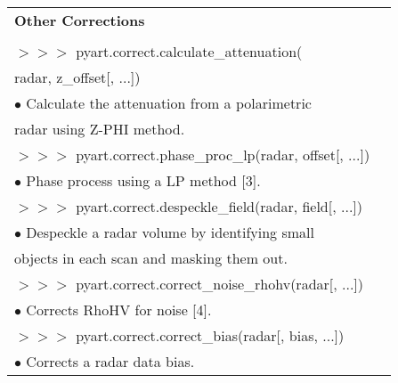 \documentclass[potrait,a0paper,fontscale=0.33]{baposter} %
\begin{document}
\begin{poster}
{\begin{flushleft}
\begin{tabular}{@{}ll@{}}
\\
\multicolumn{2}{l}{\cellcolor[HTML]{DDFFFF}\bf Other Corrections} \\
\\
$>$$>$$>$ pyart.correct.calculate\_attenuation(\\
\-\hspace{1.5cm}radar, z\_offset[, ...])\\
\-\hspace{0.4cm} $\bullet$ Calculate the attenuation from a polarimetric\\
\-\hspace{0.7cm} radar using Z-PHI method.\\
$>$$>$$>$ pyart.correct.phase\_proc\_lp(radar, offset[, ...])\\
\-\hspace{0.4cm} $\bullet$ Phase process using a LP method [3].\\
$>$$>$$>$ pyart.correct.despeckle\_field(radar, field[, ...])\\
\-\hspace{0.4cm} $\bullet$ Despeckle a radar volume by identifying small\\
\-\hspace{0.7cm} objects in each scan and masking them out.\\
$>$$>$$>$ pyart.correct.correct\_noise\_rhohv(radar[, ...])\\
\-\hspace{0.4cm} $\bullet$ Corrects RhoHV for noise [4].\\
$>$$>$$>$ pyart.correct.correct\_bias(radar[, bias, ...])\\
\-\hspace{0.4cm} $\bullet$ Corrects a radar data bias.\\

\end{tabular}
\end{flushleft}

}


\end{poster}
\end{document}
